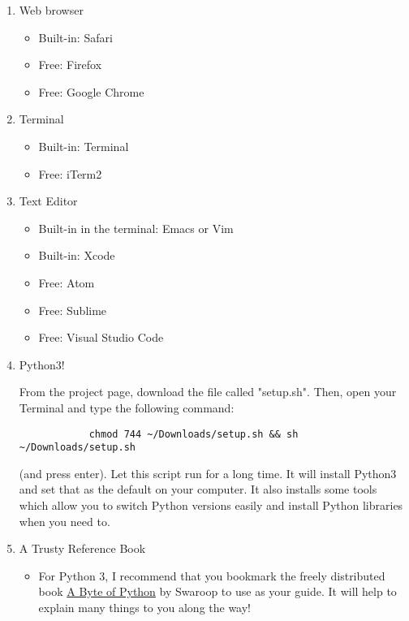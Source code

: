 \documentclass{42-en}
\begin{document}
\begin{enumerate}
	\item Web browser
	\begin{itemize}
		\item Built-in: Safari
		\item Free: Firefox
		\item Free: Google Chrome
	\end{itemize}
	\item Terminal
	\begin{itemize}
		\item Built-in: Terminal
		\item Free: iTerm2
	\end{itemize}
	\item Text Editor
	\begin{itemize}
		\item Built-in in the terminal: Emacs or Vim
		\item Built-in: Xcode
		\item Free: Atom
		\item Free: Sublime
		\item Free: Visual Studio Code
	\end{itemize}
	\newpage
	\item Python3!

		From the project page, download the file called "setup.sh".
		Then, open your Terminal and type the following command:

		\begin{verbatim}
			chmod 744 ~/Downloads/setup.sh && sh ~/Downloads/setup.sh
		\end{verbatim}
		(and press enter).
		Let this script run for a long time. It will install Python3 and set that as the default on your computer. It also installs some tools which allow you to switch Python versions easily and install Python libraries when you need to.

	\item A Trusty Reference Book
	\begin{itemize}
		\item For Python 3, I recommend that you bookmark the freely distributed book \href{https://python.swaroopch.com/}{A Byte of Python} by Swaroop to use as your guide. It will help to explain many things to you along the way!
	\end{itemize}
\end{enumerate}


\end{document}
